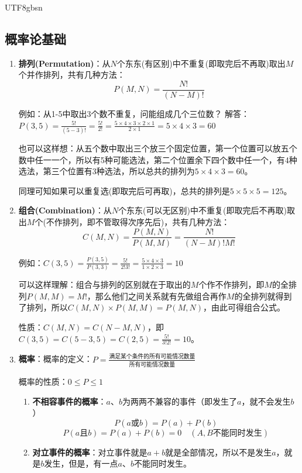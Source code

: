 \documentclass[12pt]{article}
\begin{document}
\begin{CJK*}{UTF8}{gbsn}
\subsection{概率论基础}
\begin{enumerate}
    \item \textbf{排列(Permutation)}：从$N$个东东(有区别)中不重复(即取完后不再取)取出$M$个并作排列，共有几种方法：
    $$P(M,N) = \frac{N!}{(N-M)!}$$
    
    例如：从1-5中取出3个数不重复，问能组成几个三位数？
    解答：$P(3,5) = \frac{5!}{(5-3)!} = \frac{5!}{2!} = \frac{5 \times 4 \times 3 \times 2 \times 1}{2 \times 1} = 5 \times 4 \times 3 = 60$
    
    也可以这样想：从五个数中取出三个放三个固定位置，第一个位置可以放五个数中任一一个，所以有5种可能选法，第二个位置余下四个数中任一个，有4种选法，第三个位置有3种选法，所以总共的排列为$5 \times 4 \times 3 = 60$。
    
    同理可知如果可以重复选(即取完后可再取)，总共的排列是$5 \times 5 \times 5 = 125$。
    
    \item \textbf{组合(Combination)}：从$N$个东东(可以无区别)中不重复(即取完后不再取)取出$M$个(不作排列，即不管取得次序先后)，共有几种方法：
    $$C(M,N) = \frac{P(M,N)}{P(M,M)} = \frac{N!}{(N-M)!M!}$$
    
    例如：$C(3,5) = \frac{P(3,5)}{P(3,3)} = \frac{5!}{2!3!} = \frac{5 \times 4 \times 3}{1 \times 2 \times 3} = 10$
    
    可以这样理解：组合与排列的区别就在于取出的$M$个作不作排列，即$M$的全排列$P(M,M) = M!$，那么他们之间关系就有先做组合再作$M$的全排列就得到了排列，所以$C(M,N) \times P(M,M) = P(M,N)$，由此可得组合公式。
    
    性质：$C(M,N) = C(N-M, N)$，即$C(3,5) = C(5-3, 5) = C(2,5) = \frac{5!}{3!2!} = 10$。
    
    \item \textbf{概率}：概率的定义：$P = \frac{\text{满足某个条件的所有可能情况数量}}{\text{所有可能情况数量}}$
    
    概率的性质：$0 \leq P \leq 1$
    
    \begin{enumerate}
        \item \textbf{不相容事件的概率}：$a$、$b$为两两不兼容的事件（即发生了$a$，就不会发生$b$）
        $$P(a \text{或} b) = P(a) + P(b)$$
        $$P(a \text{且} b) = P(a) + P(b) = 0 \quad (A,B \text{不能同时发生})$$
        
        \item \textbf{对立事件的概率}：对立事件就是$a + b$就是全部情况，所以不是发生$a$，就是$b$发生，但是，有一点$a$、$b$不能同时发生。
        

\end{enumerate}
\end{enumerate}
\end{CJK*}
\end{document}
